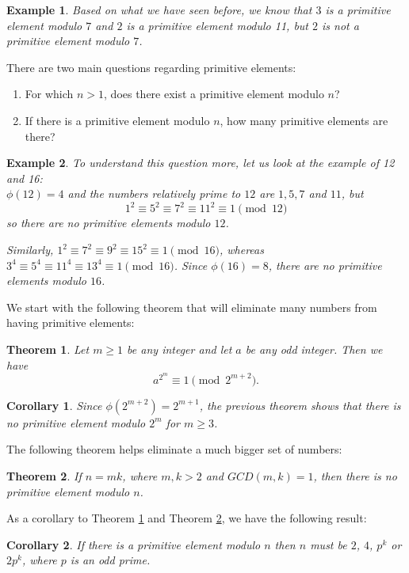 \documentclass[12pt]{article}
\theoremstyle{plain}
\newtheorem{corollary}{Corollary}
\newtheorem{example}{Example}
\newtheorem{theorem}{Theorem}
\theoremstyle{definition}
\theoremstyle{remark}
\begin{document}
\begin{example}
Based on what we have seen before, we know that $3$ is a primitive element modulo $7$ and $2$ is a primitive element modulo 11, but $2$ is not a primitive element modulo $7$.
\end{example}

\bigskip
\noindent
There are two main questions regarding primitive elements:
\begin{enumerate}
    \item For which $n>1$, does there exist a primitive element modulo $n$?
    \item If there is a primitive element modulo $n$, how many primitive elements are there?
\end{enumerate}

\begin{example}
To understand this question more, let us look at the example of 12 and 16:
\\ $\phi(12)=4$ and the numbers relatively prime to $12$ are $1, 5, 7$ and $11$, but
$$1^2\equiv 5^2\equiv 7^2\equiv 11^2 \equiv 1 \pmod{12}$$ so there are no primitive elements modulo $12$.

Similarly, $1^2 \equiv 7^2 \equiv 9^2 \equiv 15^2 \equiv 1 \pmod{16}$, whereas $3^4 \equiv5^4\equiv 11^4 \equiv 13^4 \equiv 1 \pmod{16}$. Since $\phi(16)=8$, there are no primitive elements modulo $16$.
\end{example}

\bigskip
\noindent
We start with the following theorem that will eliminate many numbers from having primitive elements:
\begin{theorem}\label{prim1}
Let $m\geq 1$ be any integer and let $a$ be any odd integer. Then we have
$$a^{2^m} \equiv 1 \pmod{2^{m+2}}.$$
\end{theorem}
\begin{corollary}
Since $\phi(2^{m+2})=2^{m+1}$, the previous theorem shows that there is no primitive element modulo $2^{m}$ for $m\geq 3$.
\end{corollary}

The following theorem helps eliminate a much bigger set of numbers:
\begin{theorem}\label{prim2}
If $n=mk$, where $m,k>2$ and $GCD(m,k)=1$, then there is no primitive element modulo $n$.
\end{theorem}

\bigskip
\noindent
As a corollary to Theorem \ref{prim1} and Theorem \ref{prim2}, we have the following result:
\begin{corollary}
If there is a primitive element modulo $n$ then $n$ must be $2$, $4$, $p^k$ or $2p^k$, where $p$ is an odd prime.
\end{corollary}
\end{document}
